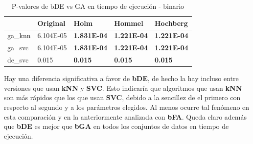 \begin{table}[htp]
    \centering
    \begin{tabular}{lllll}
        \toprule
        {}      & Original  & Holm               & Hommel             & Hochberg           \\
        \midrule
        ga\_knn & 6.104E-05 & \textbf{1.831E-04} & \textbf{1.221E-04} & \textbf{1.221E-04} \\
        ga\_svc & 6.104E-05 & \textbf{1.831E-04} & \textbf{1.221E-04} & \textbf{1.221E-04} \\
        de\_svc & 0.015     & \textbf{0.015}     & \textbf{0.015}     & \textbf{0.015}     \\
        \bottomrule
    \end{tabular}
    \caption{P-valores de bDE vs GA en tiempo de ejecución - binario}
    \label{tab:de_vs_ga-bin_exec_time}
\end{table}

Hay una diferencia significativa a favor de \textbf{bDE}, de hecho la hay incluso entre versiones que usan \textbf{kNN} y \textbf{SVC}. Esto indicaría que algoritmos que usan \textbf{kNN} son más rápidos que los que usan \textbf{SVC}, debido a la sencillez de el primero con respecto al segundo y a los parámetros elegidos. Al menos ocurre tal fenómeno en esta comparación y en la anteriormente analizada con \textbf{bFA}. Queda claro además que \textbf{bDE} es mejor que \textbf{bGA} en todos los conjuntos de datos en tiempo de ejecución.

